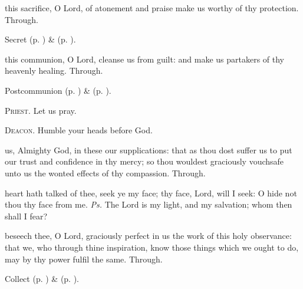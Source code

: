
\clearpage
\secret
{} this sacrifice, O Lord, of atonement and praise make us worthy of thy protection. Through.


\begin{rubric}
     Secret  (p. \pageref{AshWednesdayMassSecret}) \&   (p. \pageref{SPLivingDeparted}).
\end{rubric}


\postcommunion
{} this communion, O Lord, cleanse us from guilt: and make us partakers of thy heavenly healing. Through.


\begin{rubric}
     Postcommunion  (p. \pageref{AshWednesdayMassPostcommunion}) \&   (p. \pageref{SPLivingDeparted}).
\end{rubric}

\textsc{Priest.} Let us pray.\par
\textsc{Deacon.} Humble your heads before God.\par
{} us, Almighty God, in these our supplications: that as thou dost suffer us to put our trust and confidence in thy mercy; so thou wouldest graciously vouchsafe unto us the wonted effects of thy compassion. Through.


\introit
{} heart hath talked of thee, seek ye my face; thy face, Lord, will I seek: O hide not thou thy face from me. \textit{Ps.} The Lord is my light, and my salvation; whom then shall I fear?

\collect
{} beseech thee, O Lord, graciously perfect in us the work of this holy observance: that we, who through thine inspiration, know those things which we ought to do, may by thy power fulfil the same. Through.

\begin{rubric}
     Collect  (p. \pageref{AshWednesdayMassCollect}) \&   (p. \pageref{SPLivingDeparted}).
\end{rubric}

